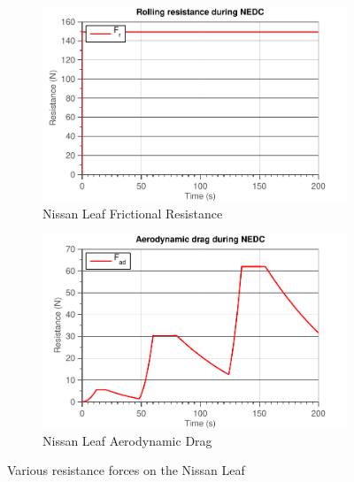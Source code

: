 \documentclass[11pt,titlepage]{report}
\begin{document}
\begin{enumerate}
\begin{itemize}
		\begin{figure}[H]
			\begin{center}
				\begin{subfigure}[h]{0.49\textwidth}
					\includegraphics[width=\textwidth]{resource/leaf/resistance-friction-rc.pdf}
					\caption{Nissan Leaf Frictional Resistance}
					\label{fig:ass4-t1-resistance-friction}
				\end{subfigure}
				\enspace
				\begin{subfigure}[h]{0.49\textwidth}
					\includegraphics[width=\textwidth]{resource/leaf/resistance-aero-rc.pdf}
					\caption{Nissan Leaf Aerodynamic Drag}
					\label{fig:ass4-t1-resistance-aero}
				\end{subfigure}
			\end{center}
			\caption{Various resistance forces on the Nissan Leaf}
			\label{fig:ass4-t1-resistance}
		\end{figure}


\end{itemize}
\end{enumerate}
\end{document}
